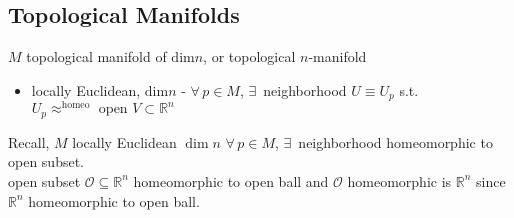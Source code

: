 %                                               
%                                                              
%
 






\subsection*{Topological Manifolds }

$M$ topological manifold of $\text{dim}{n}$, or topological $n$-manifold 
\begin{itemize}
\item locally Euclidean, $\text{dim}{n}$ - $\forall \, p \in M$, $\exists \, $ neighborhood $U \equiv U_p$ s.t. $U_p \approx^{\text{homeo}} \text{ open } V \subset \mathbb{R}^n$ 
\end{itemize}


 Recall, $M$ locally Euclidean $\dim{n}$ $\forall \, p \in M$, $\exists \,$ neighborhood homeomorphic to open subset. \\
open subset $\mathcal{O} \subseteq \mathbb{R}^n$ homeomorphic to open ball and $\mathcal{O}$ homeomorphic is $\mathbb{R}^n$ since $\mathbb{R}^n$ homeomorphic to open ball.  

